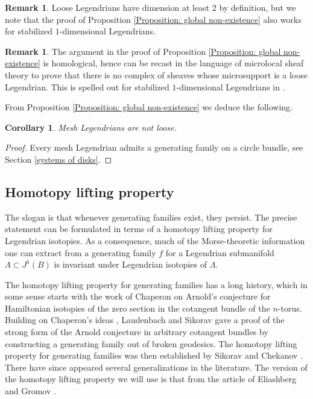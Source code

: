 \documentclass[11pt]{article}
\numberwithin{equation}{section}\providecommand{\dpl}{\displaystyle}
\theoremstyle{plain}
\newtheorem{corollary}[theorem]{Corollary}
\theoremstyle{definition}
\newtheorem{remark}[theorem]{Remark}
\begin{document}
\begin{remark}
Loose Legendrians have dimension at least 2 by definition, but we note that the proof of Proposition \ref{Proposition: global non-existence} also works for stabilized $1$-dimensional Legendrians.
\end{remark}

\begin{remark}
The argument in the proof of Proposition \ref{Proposition: global non-existence} is homological, hence can be recast in the language of microlocal sheaf theory to prove that there is no complex of sheaves whose microsupport is a loose Legendrian. This is spelled out for stabilized $1$-dimensional Legendrians in \cite{STZ17}.
\end{remark}

From Proposition \ref{Proposition: global non-existence} we deduce the following.

\begin{corollary}
Mesh Legendrians are not loose.
\end{corollary}
\begin{proof} Every mesh Legendrian admits a generating family on a circle bundle, see Section \ref{systems of disks}.\end{proof}

\subsection{Homotopy lifting property}

The slogan is that whenever generating families exist, they persist. The precise statement can be formulated in terms of a homotopy lifting property for Legendrian isotopies. As a consequence, much of the Morse-theoretic information one can extract from a generating family $f$ for a Legendrian submanifold $\Lambda \subset J^1(B)$ is invariant under Legendrian isotopies of $\Lambda$.

The homotopy lifting property for generating families has a long history, which in some sense starts with the work of Chaperon on Arnold's conjecture for Hamiltonian isotopies of the zero section in the cotangent bundle of the $n$-torus. Building on Chaperon's ideas \cite{C84}, Laudenbach and Sikorav gave a proof of the strong form of the Arnold conjecture in arbitrary cotangent bundles \cite{LS85} by constructing a generating family out of broken geodesics. The homotopy lifting property for generating families was then established by Sikorav \cite{S86} and Chekanov \cite{C96}. There have since appeared several generalizations in the literature. The version of the homotopy lifting property we will use is that from the article of Eliashberg and Gromov \cite{EG98}.
\end{document}
